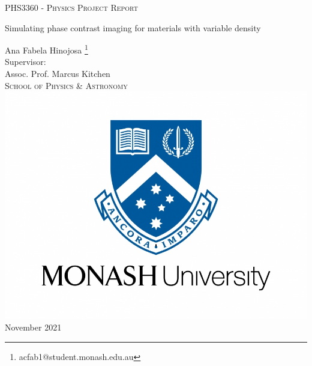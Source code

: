\documentclass[10pt, a4paper, singlespacing]{report}
\begin{document}
\begin{titlepage}
\begin{center}

\vspace{0.5cm}
\textsc{PHS3360 - Physics Project Report} \\
\vspace{2.5cm}

{\Huge Simulating phase contrast imaging for materials with variable density}
\vspace{3cm}

{\LARGE Ana Fabela Hinojosa \footnote{acfab1@student.monash.edu.au}} \\
\vspace{0.4cm}
{\Large Supervisor:\\ Assoc. Prof. Marcus Kitchen \\}
\textsc{School of Physics \& Astronomy} \\
\vspace{3cm}
\includegraphics[scale=0.2]{logo.jpg} \\ %
\vspace{3cm}
{\LARGE November 2021}\\
\vspace{0.5cm}
\end{center}
\end{titlepage}


\vspace*{0.2\textheight}
\end{document}
